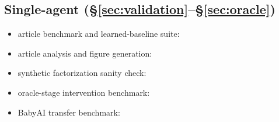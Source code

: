 \documentclass{article}
\begin{document}
\subsection*{Single-agent (\S\ref{sec:validation}--\S\ref{sec:oracle})}
\begin{itemize}[leftmargin=16pt]
\item article benchmark and learned-baseline suite: 
\item article analysis and figure generation: 
\item synthetic factorization sanity check: 
\item oracle-stage intervention benchmark: 
\item BabyAI transfer benchmark: 
\end{itemize}
\end{document}
